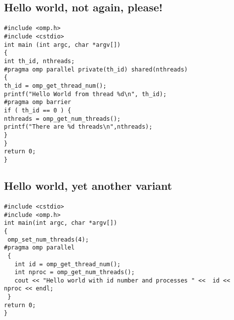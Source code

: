 \noindent



\subsection*{Hello world, not again, please!}

\paragraph{}


















\begin{verbatim}
#include <omp.h>
#include <cstdio>
int main (int argc, char *argv[])
{
int th_id, nthreads;
#pragma omp parallel private(th_id) shared(nthreads)
{
th_id = omp_get_thread_num();
printf("Hello World from thread %d\n", th_id);
#pragma omp barrier
if ( th_id == 0 ) {
nthreads = omp_get_num_threads();
printf("There are %d threads\n",nthreads);
}
}
return 0;
}

\end{verbatim}



\subsection*{Hello world, yet another variant}

\paragraph{}














\begin{verbatim}
#include <cstdio>
#include <omp.h>
int main(int argc, char *argv[]) 
{
 omp_set_num_threads(4); 
#pragma omp parallel
 {
   int id = omp_get_thread_num();
   int nproc = omp_get_num_threads(); 
   cout << "Hello world with id number and processes " <<  id <<  nproc << endl;
 } 
return 0;
}

\end{verbatim}

